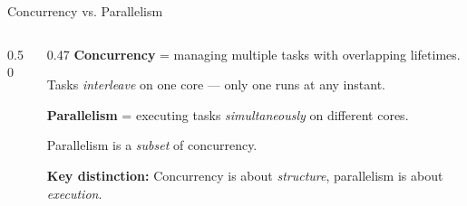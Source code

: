 \documentclass[aspectratio=169]{beamer}
\begin{document}
\begin{frame}{Concurrency vs. Parallelism}
\begin{columns}
\begin{column}{0.50\textwidth}
        \end{column}
        \begin{column}{0.47\textwidth}
            \textbf{Concurrency} = managing multiple tasks with
            overlapping lifetimes.

            \vspace{0.3em}
            Tasks \textit{interleave} on one core --- only one runs
            at any instant.

            \pause
            \vspace{1em}
            \textbf{Parallelism} = executing tasks \textit{simultaneously}
            on different cores.

            \vspace{0.3em}
            Parallelism is a \textit{subset} of concurrency.

            \vspace{1em}
            \small
            \colorbox{splitline!15}{\parbox{0.9\textwidth}{
                \textbf{Key distinction:} Concurrency is about
                \textit{structure}, parallelism is about
                \textit{execution}.
            }}
        \end{column}
    \end{columns}
\end{frame}
\end{document}

